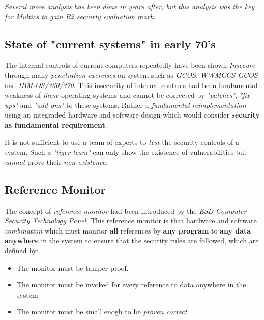 \textit{Several more analysis has been done in years after, but this analysis was the key 
for Multics to gain B2 secuirty evaluation mark.}


\subsection{State of "current systems" in early 70's}

The internal controls of current computers repeatedly have been shown \textit{Insecure} through many
\textit{penetration exercises} on system such as \textit{GCOS}, \textit{WWMCCS GCOS} and \textit{IBM OS/360/370}.
This insecurity of internal controls had been fundamental weakness of \textit{these} operating systems 
and cannot be corrected by \textit{"patches"}, \textit{"fix-ups"} and \textit{"add-ons"} to these systems.
Rather a \textit{fundamental reimplementation} using an integraded hardware and software design which would 
consider \textbf{security as fundamental requirement}.

It is not sufficient to use a team of experts to \textit{test} the security controls of a system. Such a 
\textit{"tiger team"} can only show the existence of vulnerabilities but \textit{cannot} 
prove their \textit{non-existence}.

\subsection{Reference Monitor}

The concept of \textit{reference monitor} had been introduced by the \textit{ESD Computer Security 
Technology Panel}. This reference monitor is that hardware and software \textit{combination} which 
must monitor \textbf{all} references by \textbf{any program} to \textbf{any data anywhere} in the 
system to ensure that the security rules are followed, which are defined by:
\begin{itemize}
    \item The monitor must be tamper proof.
    \item The monitor must be invoked for every reference to data anywhere in the system
    \item The monitor must be small enogh to be \textit{proven correct} 
\end{itemize}

